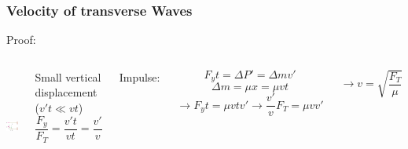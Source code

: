 \documentclass[]{beamer}
\begin{document}
\begin{frame}
\frametitle{Velocity of transverse Waves}
Proof:




   \begin{columns}[c]
   \column{2.5in}  %

 \begin{center}
  \includegraphics[height=1.5in]{images4/6.jpg}
\end{center}

  \pause
Small vertical displacement ($v't\ll vt$)
\pause
\begin{equation}
\frac{F_y}{F_T}=\frac{v't}{vt}=\frac{v'}{v}
\end{equation}
\pause

Impulse:

 \begin{equation*}
F_y t=\Delta P'=\Delta mv'
\end{equation*}
\pause
\begin{equation*}
\Delta m=\mu x=\mu vt
\end{equation*}
\pause
\begin{equation*}
\rightarrow F_y t=\mu vtv' \rightarrow \frac{v'}{v}F_T=\mu vv'
\end{equation*}
\pause

\begin{equation}
\rightarrow v=\sqrt{\frac{F_T}{\mu}}
\end{equation}

   \end{columns}



  \end{frame}



\end{document}
